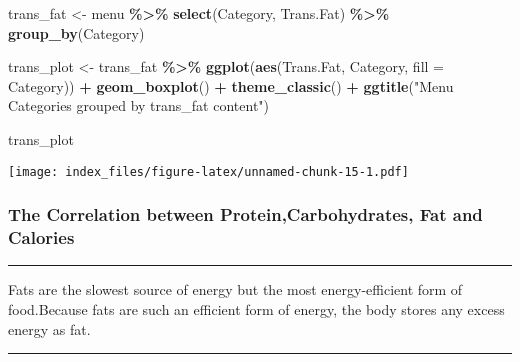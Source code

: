 \documentclass[
]{article}
\newenvironment{Shaded}{\begin{snugshade}}{\end{snugshade}}
\newcommand{\AttributeTok}[1]{\textcolor[rgb]{0.13,0.29,0.53}{#1}}
\newcommand{\FunctionTok}[1]{\textcolor[rgb]{0.13,0.29,0.53}{\textbf{#1}}}
\newcommand{\NormalTok}[1]{#1}
\newcommand{\OtherTok}[1]{\textcolor[rgb]{0.56,0.35,0.01}{#1}}
\newcommand{\SpecialCharTok}[1]{\textcolor[rgb]{0.81,0.36,0.00}{\textbf{#1}}}
\newcommand{\StringTok}[1]{\textcolor[rgb]{0.31,0.60,0.02}{#1}}
\begin{document}
\begin{Shaded}
\begin{Highlighting}[]
\NormalTok{trans\_fat }\OtherTok{\textless{}{-}}\NormalTok{ menu }\SpecialCharTok{\%\textgreater{}\%}
  \FunctionTok{select}\NormalTok{(Category,}
\NormalTok{         Trans.Fat) }\SpecialCharTok{\%\textgreater{}\%}
  \FunctionTok{group\_by}\NormalTok{(Category)}

\NormalTok{trans\_plot }\OtherTok{\textless{}{-}}\NormalTok{ trans\_fat }\SpecialCharTok{\%\textgreater{}\%} 
  \FunctionTok{ggplot}\NormalTok{(}\FunctionTok{aes}\NormalTok{(Trans.Fat,}
\NormalTok{             Category,}
             \AttributeTok{fill =}\NormalTok{ Category)) }\SpecialCharTok{+} 
  \FunctionTok{geom\_boxplot}\NormalTok{() }\SpecialCharTok{+} \FunctionTok{theme\_classic}\NormalTok{() }\SpecialCharTok{+}  \FunctionTok{ggtitle}\NormalTok{(}\StringTok{"Menu Categories grouped by trans\_fat content"}\NormalTok{)}

\NormalTok{trans\_plot}
\end{Highlighting}
\end{Shaded}

\texttt{[image: index\_files/figure-latex/unnamed-chunk-15-1.pdf]}

\hypertarget{the-correlation-between-proteincarbohydrates-fat-and-calories}{%
\subsubsection{The Correlation between Protein,Carbohydrates, Fat and
Calories}\label{the-correlation-between-proteincarbohydrates-fat-and-calories}}

\begin{center}\rule{0.5\linewidth}{0.5pt}\end{center}

Fats are the slowest source of energy but the most energy-efficient form
of food.Because fats are such an efficient form of energy, the body
stores any excess energy as fat.

\begin{center}\rule{0.5\linewidth}{0.5pt}\end{center}
\end{document}
